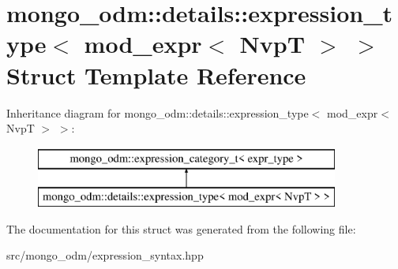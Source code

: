 \hypertarget{structmongo__odm_1_1details_1_1expression__type_3_01mod__expr_3_01NvpT_01_4_01_4}{}\section{mongo\+\_\+odm\+:\+:details\+:\+:expression\+\_\+type$<$ mod\+\_\+expr$<$ NvpT $>$ $>$ Struct Template Reference}
\label{structmongo__odm_1_1details_1_1expression__type_3_01mod__expr_3_01NvpT_01_4_01_4}
Inheritance diagram for mongo\+\_\+odm\+:\+:details\+:\+:expression\+\_\+type$<$ mod\+\_\+expr$<$ NvpT $>$ $>$\+:\begin{figure}[H]
\begin{center}
\leavevmode
\includegraphics[height=2.000000cm]{structmongo__odm_1_1details_1_1expression__type_3_01mod__expr_3_01NvpT_01_4_01_4}
\end{center}
\end{figure}


The documentation for this struct was generated from the following file\+:\begin{DoxyCompactItemize}
\item 
src/mongo\+\_\+odm/expression\+\_\+syntax.\+hpp\end{DoxyCompactItemize}
